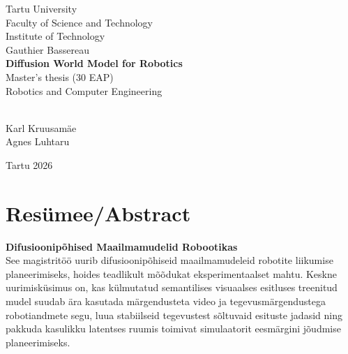 \documentclass[12pt]{report}
\begin{document}
\thispagestyle{empty}
\begin{large}
\begin{center}
\vspace{20mm}
Tartu University
\\[5mm]
Faculty of Science and Technology
\\[5mm]
Institute of Technology
\\[5mm]
\vspace{50mm}
Gauthier Bassereau
\\[10mm]
\textbf{Diffusion World Model for Robotics}
\\[10mm]
Master's thesis (30 EAP)\\
Robotics and Computer Engineering\\
\end{center}
\vspace{20mm}
\\[5mm]
Karl Kruusamäe\\
Agnes Luhtaru\\
\begin{center}
\vspace{65mm}
Tartu 2026\\
\end{center}
\end{large}
\newpage

\chapter*{Res\"umee/Abstract}
\textbf{Difusioonip\~ohised Maailmamudelid Robootikas}
\\[5mm]
See magistritöö uurib difusioonipõhiseid maailmamudeleid robotite liikumise planeerimiseks, hoides teadlikult mõõdukat eksperimentaalset mahtu. Keskne uurimisküsimus on, kas külmutatud semantilises visuaalses esitluses treenitud mudel suudab ära kasutada märgendusteta video ja tegevusmärgendustega robotiandmete segu, luua stabiilseid tegevustest sõltuvaid esituste jadasid ning pakkuda kasulikku latentses ruumis toimivat simulaatorit eesmärgini jõudmise planeerimiseks.
\end{document}
